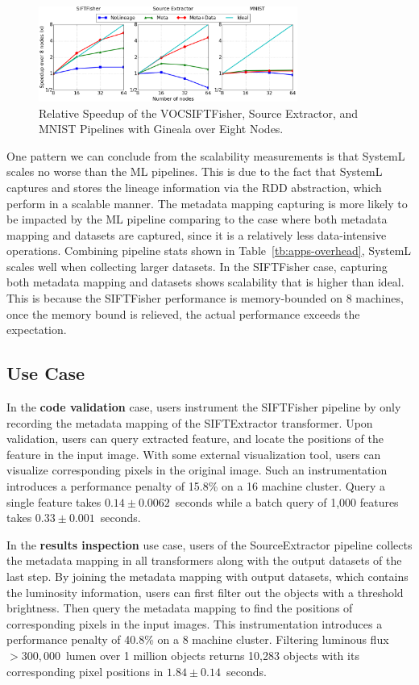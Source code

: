 \documentclass{sig-alternate}
\begin{document}
\begin{figure}[h]
\begin{center}
    \includegraphics[width=85mm]{pictures/Scalability}
\caption {Relative Speedup of the VOCSIFTFisher, Source Extractor, and MNIST Pipelines with Gineala over Eight Nodes.
    \label{fig:scalability}
}
\end{center}
\end{figure}

One pattern we can conclude from the scalability measurements is that SystemL scales no worse than the ML pipelines.
This is due to the fact that SystemL captures and stores the lineage information via the RDD abstraction, which perform
in a scalable manner. 
The metadata mapping capturing is more likely to be impacted by the ML pipeline comparing to the case where both metadata
mapping and datasets are captured, since it is a relatively less data-intensive operations.
Combining pipeline stats shown in Table~\ref{tb:apps-overhead}, SystemL scales  well when collecting larger datasets.
In the SIFTFisher case, capturing both metadata mapping and datasets shows scalability that is higher than ideal.
This is because the SIFTFisher performance is memory-bounded on 8 machines, once the memory bound is relieved, the actual performance
exceeds the expectation.

\subsection{Use Case}
In the {\bf code validation} case, users instrument the SIFTFisher pipeline by only recording the metadata mapping of the SIFTExtractor transformer.
Upon validation, users can query extracted feature, and locate the positions of the feature in the input image. With some external visualization tool,
users can visualize corresponding pixels in the original image. Such an instrumentation introduces a performance penalty of 15.8\% on a 16 machine 
cluster.
Query a single feature takes $0.14\pm0.0062$~seconds while a batch query of 1,000 features takes $0.33\pm0.001$~seconds.

In the {\bf results inspection} use case, users of the SourceExtractor pipeline collects the metadata mapping in all transformers along with the output 
datasets of the last step. By joining the metadata mapping with output datasets, which contains the luminosity information, users can first filter out the
objects with a threshold brightness. Then query the metadata mapping to find the positions of corresponding pixels in the input images.
This instrumentation introduces a performance penalty of 40.8\% on a 8 machine cluster. 
Filtering luminous flux $>300,000$~lumen over 1 million objects returns 10,283 objects
with its corresponding pixel positions in $1.84\pm0.14$~seconds.
\end{document}
